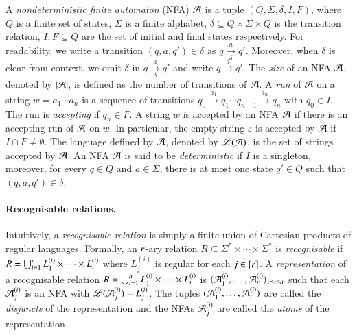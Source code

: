 A \emph{nondeterministic finite automaton} (NFA) $\mathcal{A}$ is a tuple $(Q, \Sigma, \delta, I, F)$, where $Q$ is a finite set of states, $\Sigma$ is a finite alphabet, $\delta \subseteq Q \times \Sigma \times Q$ is the transition relation, $I,F \subseteq Q$ are the set of initial and final states respectively. For readability, we write a transition $(q, a, q') \in \delta$ as $q \xrightarrow[\delta]{a} q'$. Moreover, when $\delta$ is clear from context, we omit $\delta$ in $q \xrightarrow[\delta]{a} q'$ and write $q \xrightarrow{a} q'$. The \emph{size} of an NFA $\mathcal{A}$, denoted by $|\mathcal{A}|$, is defined as the number of transitions of $\mathcal{A}$.
%
A \emph{run} of $\mathcal{A}$ on a string $w = a_1 \cdots a_n$ is a sequence of transitions $q_0 \xrightarrow{a_1} q_1 \cdots q_{n-1} \xrightarrow{a_n} q_n$ with $q_0 \in I$. The run is \emph{accepting} if $q_n \in F$.
A string $w$ is accepted by an NFA $\mathcal{A}$ if there is an accepting run of $\mathcal{A}$ on $w$. In particular, the empty string $\varepsilon$ is accepted by $\mathcal{A}$ if $I \cap F \neq \emptyset$. The language defined by $\mathcal{A}$, denoted by $\mathscr{L}(\mathcal{A})$, is the set of strings accepted by $\mathcal{A}$. An NFA $\mathcal{A}$ is said to be \emph{deterministic} if $I$ is a singleton, moreover, for every $q \in Q$ and $a \in \Sigma$, there is at most one state $q' \in Q$ such that $(q, a, q') \in \delta$.

\paragraph*{Recognisable relations.} Intuitively, a \emph{recognisable relation} is simply a finite union of Cartesian products of regular languages. Formally, an $r$-ary relation $R\subseteq \Sigma^*\times \cdots\times \Sigma^*$ is \emph{recognisable} if $R=\bigcup_{i=1}^n L^{(i)}_1\times \cdots\times L^{(i)}_r$ where $L^{(i)}_j$ is regular for each $j\in [r]$. A \emph{representation} of a recognisable relation $R=\bigcup_{i=1}^n L^{(i)}_1\times \cdots\times L^{(i)}_r$ is $(\mathcal{A}^{(i)}_1, \ldots, \mathcal{A}^{(i)}_r)_{1 \le i \le n}$ such that each $\mathcal{A}^{(i)}_j$ is an NFA with $\mathscr{L}(\mathcal{A}^{(i)}_j)=L^{(i)}_j$. The tuples $(\mathcal{A}^{(i)}_1, \ldots, \mathcal{A}^{(i)}_r)$ are called the \emph{disjuncts} of the representation and the NFAs $\mathcal{A}^{(i)}_j$ are called the \emph{atoms} of the representation.




